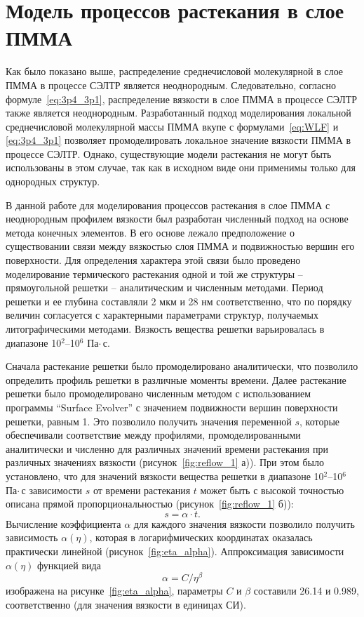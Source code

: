 \section{Модель процессов растекания в слое ПММА}

Как было показано выше, распределение среднечисловой молекулярной в слое ПММА в процессе СЭЛТР является неоднородным. Следовательно, согласно формуле~\ref{eq:3p4_3p1}, распределение вязкости в слое ПММА в процессе СЭЛТР также является неоднородным. Разработанный подход моделирования локальной среднечисловой молекулярной массы ПММА вкупе с формулами~\ref{eq:WLF} и \ref{eq:3p4_3p1} позволяет промоделировать локальное значение вязкости ПММА в процессе СЭЛТР. Однако, существующие модели растекания не могут быть использованы в этом случае, так как в исходном виде они применимы только для однородных структур.

В данной работе для моделирования процессов растекания в слое \linebreak ПММА с неоднородным профилем вязкости был разработан численный подход на основе метода конечных элементов. В его основе лежало предположение о существовании связи между вязкостью слоя ПММА и подвижностью вершин его поверхности. Для определения характера этой связи было проведено моделирование термического растекания одной и той же структуры -- прямоугольной решетки -- аналитическим и численным методами. Период решетки и ее глубина составляли 2 мкм и 28 нм соответственно, что по порядку величин согласуется с характерными параметрами структур, получаемых литографическими методами. Вязкость вещества решетки варьировалась в диапазоне 10$^\text{2}$--10$^\text{6}$ Па\:$\cdot$\,с.

Сначала растекание решетки было промоделировано аналитически, что позволило определить профиль решетки в различные моменты времени. Далее растекание решетки было промоделировано численным методом с использованием программы ``Surface Evolver'' с значением подвижности вершин поверхности решетки, равным 1. Это позволило получить значения переменной $s$, которые обеспечивали соответствие между профилями, промоделированными аналитически и численно для различных значений времени растекания при различных значениях вязкости (рисунок~\ref{fig:reflow_1} а)). При этом было установлено, что для значений вязкости вещества решетки в диапазоне 10$^\text{2}$--10$^\text{6}$ Па\:$\cdot$\,с зависимости $s$ от времени растекания $t$ может быть с высокой точностью описана прямой пропорциональностью (рисунок~\ref{fig:reflow_1} б)):
\begin{equation}
	s = \alpha \cdot t.
\end{equation}
Вычисление коэффициента $\alpha$ для каждого значения вязкости позволило получить зависимость $\alpha(\eta)$, которая в логарифмических координатах оказалась практически линейной (рисунок~\ref{fig:eta_alpha}). Аппроксимация зависимости $\alpha(\eta)$ функцией вида
\begin{equation}
	\alpha = C / \eta^\beta
\end{equation}
изображена на рисунке~\ref{fig:eta_alpha}, параметры $C$ и $\beta$ составили 26.14 и 0.989, соответственно (для значения вязкости в единицах СИ).

